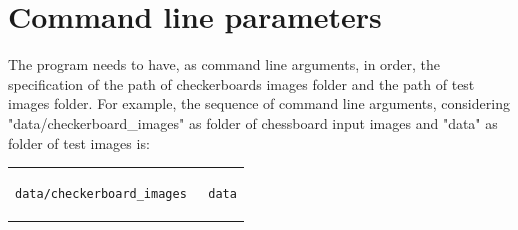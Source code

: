 \documentclass{article}
\begin{document}
\section{Command line parameters}
The program needs to have, as command line arguments, in order, the specification of the path of checkerboards images folder and the path of test images folder. For example, the sequence of command line arguments, considering "data/checkerboard\_images" as folder of chessboard input images and "data" as folder of test images is:\\
\begin{center}
\begin{tabular}{c}
\begin{lstlisting}[linewidth=160pt, basicstyle=\footnotesize\sffamily,] 
data/checkerboard_images   data
\end{lstlisting}
\end{tabular}
\end{center}
\end{document}
